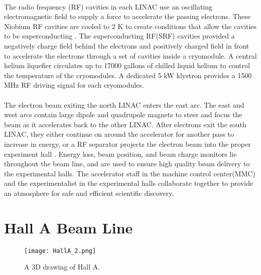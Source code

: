 	\paragraph{}The radio frequency (RF) cavities in each LINAC use an oscillating electromagnetic field to supply a force to accelerate the passing electrons. These Niobium RF cavities are cooled to 2 K to create conditions that allow the cavities to be superconducting \cite{HallA}. The superconducting RF(SRF) cavities provided a negatively charge field behind the electrons and positively charged field in front to accelerate the electrons through a set of cavities inside a cryomodule. A central helium liquefier circulates up to 17000 gallons of chilled liquid helium to control the temperature of the cryomodules. A dedicated 5 kW klystron  provides a 1500 MHz RF driving signal for each cryomodules. 
	\paragraph{} The electron beam exiting the north LINAC enters the east arc. The east and west arcs contain large dipole and quadrupole magnets to steer and focus the beam as it accelerates back to the other LINAC. After electrons exit the south LINAC, they either continue on around the accelerator for another pass to increase in energy, or a RF separator projects the electron beam into the proper experiment hall \cite{CEBAF}. Energy loss, beam position, and beam charge monitors lie throughout the beam line, and are used to ensure high quality beam delivery to the experimental halls. The accelerator staff in the machine control center(MMC) and the experimentalist in the experimental halls collaborate together to provide an atmosphere for safe and efficient scientific discovery.

 \section{Hall A Beam Line}\label{sec:halla}
	 
	\begin{figure}[H]
		\centering
		\texttt{[image: HallA\_2.png]} 
				\caption{A 3D drawing of Hall A. }
		\label{HallA}
	\end{figure} 	 
	 
